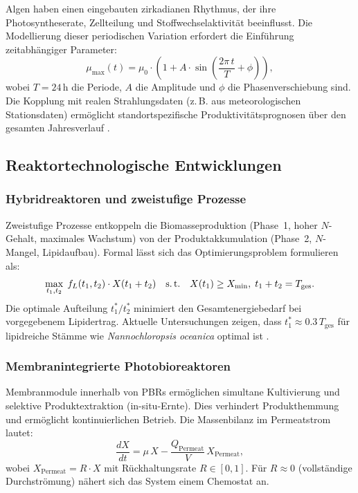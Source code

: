 ﻿\documentclass[a4paper,12pt]{article}
\theoremstyle{definition}
\begin{document}
Algen haben einen eingebauten zirkadianen Rhythmus, der ihre Photosyntheserate,
Zellteilung und Stoffwechselaktivität beeinflusst. Die Modellierung dieser
periodischen Variation erfordert die Einführung zeitabhängiger Parameter:
\[
	\mu_\mathrm{max}(t) = \mu_0 \cdot \left(1 + A \cdot \sin\!\left(\frac{2\pi\,t}{T} + \phi\right)\right),
\]
wobei $T = 24$\,h die Periode, $A$ die Amplitude und $\phi$ die Phasenverschiebung sind.
Die Kopplung mit realen Strahlungsdaten (z.\,B. aus meteorologischen Stationsdaten)
ermöglicht standortspezifische Produktivitätsprognosen über den gesamten Jahresverlauf
\cite{slegers2011}.

\subsection{Reaktortechnologische Entwicklungen}

\subsubsection{Hybridreaktoren und zweistufige Prozesse}

Zweistufige Prozesse entkoppeln die Biomasseproduktion (Phase~1, hoher $N$-Gehalt,
maximales Wachstum) von der Produktakkumulation (Phase~2, $N$-Mangel, Lipidaufbau).
Formal lässt sich das Optimierungsproblem formulieren als:
\[
	\max_{t_1, t_2}\; f_L(t_1, t_2) \cdot X(t_1 + t_2)
	\quad \text{s.\,t.} \quad X(t_1) \geq X_\mathrm{min},\; t_1 + t_2 = T_\mathrm{ges}.
\]
Die optimale Aufteilung $t_1^* / t_2^*$ minimiert den Gesamtenergiebedarf bei
vorgegebenem Lipidertrag. Aktuelle Untersuchungen zeigen, dass $t_1^* \approx 0.3\,T_\mathrm{ges}$
für lipidreiche Stämme wie \textit{Nannochloropsis oceanica} optimal ist
\cite{breuer2013}.

\subsubsection{Membranintegrierte Photobioreaktoren}

Membranmodule innerhalb von PBRs ermöglichen simultane Kultivierung und
selektive Produktextraktion (in-situ-Ernte). Dies verhindert Produkthemmung
und ermöglicht kontinuierlichen Betrieb. Die Massenbilanz im Permeatstrom
lautet:
\[
	\frac{dX}{dt} = \mu\,X - \frac{Q_\mathrm{Permeat}}{V}\,X_\mathrm{Permeat},
\]
wobei $X_\mathrm{Permeat} = R \cdot X$ mit Rückhaltungsrate $R \in [0, 1]$.
Für $R \approx 0$ (vollständige Durchströmung) nähert sich das System einem
Chemostat an.
\end{document}
